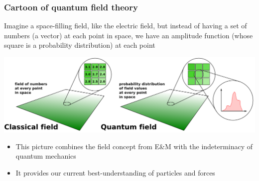 \documentclass[compress]{beamer}
\begin{document}
\begin{frame}
\frametitle{Cartoon of quantum field theory}

Imagine a space-filling field, like the electric field, but instead of having a set of numbers (a vector) at each point in space, we have an amplitude function (whose square is a probability distribution) at each point

\vspace{0.3 cm}
\includegraphics[width=\linewidth]{classical_quantum_fields.png}

\vspace{0.3 cm}
\begin{itemize}
\item This picture combines the field concept from E\&M with the indeterminacy of quantum mechanics
\item It provides our current best-understanding of particles and forces
\end{itemize}
\end{frame}
\end{document}
